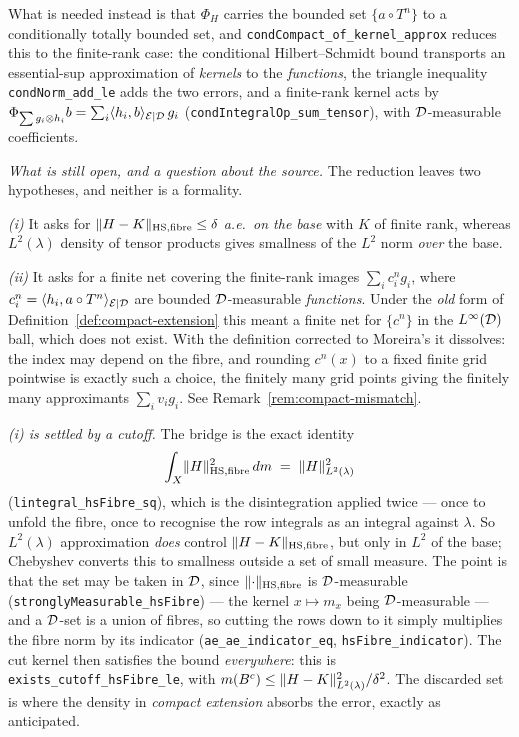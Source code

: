 \begin{remark}
  What is needed instead is that $\Phi_H$ carries the bounded set $\{a \circ T^n\}$ to a
  conditionally totally bounded set, and \texttt{condCompact\_of\_kernel\_approx} reduces this
  to the finite-rank case: the conditional Hilbert--Schmidt bound transports an
  essential-sup approximation of \emph{kernels} to the \emph{functions}, the triangle
  inequality \texttt{condNorm\_add\_le} adds the two errors, and a finite-rank kernel acts by
  $\Phi_{\sum g_i \otimes h_i} b = \sum_i \langle h_i, b \rangle_{\mathcal{E} \mid \mathcal{D}} \, g_i$
  (\texttt{condIntegralOp\_sum\_tensor}), with $\mathcal{D}$-measurable coefficients.

  \smallskip
  \emph{What is still open, and a question about the source.}  The reduction leaves two
  hypotheses, and neither is a formality.

  \emph{(i)} It asks for $\lVert H-K \rVert_{\mathrm{HS},\text{fibre}} \leq \delta$ \emph{a.e.\ on
  the base} with $K$ of finite rank, whereas $L^2(\lambda)$ density of tensor products gives
  smallness of the $L^2$ norm \emph{over} the base.

  \emph{(ii)} It asks for a finite net covering the finite-rank images $\sum_i c_i^n g_i$,
  where $c_i^n = \langle h_i, a \circ T^n \rangle_{\mathcal{E} \mid \mathcal{D}}$ are bounded $\mathcal{D}$-measurable \emph{functions}.
  Under the \emph{old} form of Definition~\ref{def:compact-extension} this meant a finite net
  for $\{c^n\}$ in the $L^{\infty}(\mathcal{D})$ ball, which does not exist.  With the definition
  corrected to Moreira's it dissolves: the index may depend on the fibre, and rounding
  $c^n(x)$ to a fixed finite grid pointwise is exactly such a choice, the finitely many grid
  points giving the finitely many approximants $\sum_i v_i g_i$.  See
  Remark~\ref{rem:compact-mismatch}.

  \smallskip
  \emph{(i) is settled by a cutoff.}  The bridge is the exact identity
  \[
    \int_X \lVert H \rVert_{\mathrm{HS},\text{fibre}}^2 \,dm \;=\; \lVert H \rVert_{L^2(\lambda)}^2
  \]
  (\texttt{lintegral\_hsFibre\_sq}), which is the disintegration applied twice --- once to
  unfold the fibre, once to recognise the row integrals as an integral against $\lambda$.  So
  $L^2(\lambda)$ approximation \emph{does} control $\lVert H-K \rVert_{\mathrm{HS},\text{fibre}}$,
  but only in $L^2$ of the base; Chebyshev converts this to smallness outside a set of small
  measure.  The point is that the set may be taken in $\mathcal{D}$, since
  $\lVert \cdot \rVert_{\mathrm{HS},\text{fibre}}$ is $\mathcal{D}$-measurable
  (\texttt{stronglyMeasurable\_hsFibre}) --- the kernel $x \mapsto m_x$ being
  $\mathcal{D}$-measurable --- and a $\mathcal{D}$-set is a union of fibres, so cutting the rows down to it
  simply multiplies the fibre norm by its indicator
  (\texttt{ae\_ae\_indicator\_eq}, \texttt{hsFibre\_indicator}).  The cut kernel then
  satisfies the bound \emph{everywhere}: this is \texttt{exists\_cutoff\_hsFibre\_le}, with
  $m(B^c) \leq \lVert H-K \rVert_{L^2(\lambda)}^2/\delta^2$.  The discarded set is where the
  density in \emph{compact extension} absorbs the error, exactly as anticipated.


\end{remark}

